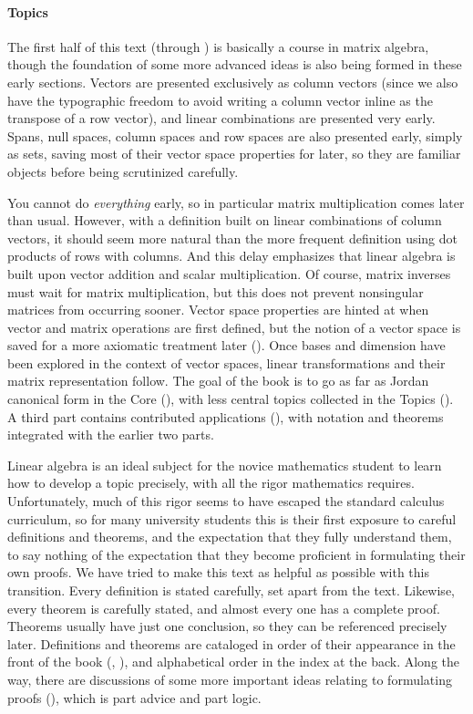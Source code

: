 \paragraph{Topics}
%
The first half of this text (through ) is basically a course in matrix algebra, though the foundation of some more advanced ideas is also being formed in these early sections.  Vectors are presented exclusively as column vectors (since we also have the typographic freedom to avoid writing a column vector inline as the transpose of a row vector), and linear combinations are presented very early.  Spans, null spaces, column spaces and row spaces are also presented early, simply as sets, saving most of their vector space properties for later, so they are familiar objects before being scrutinized carefully.\par
%
You cannot do {\em everything} early, so in particular matrix multiplication comes later than usual.  However, with a definition built on linear combinations of column vectors, it should seem more natural than the more frequent definition using dot products of rows with columns.  And this delay emphasizes that linear algebra is built upon vector addition and scalar multiplication.  Of course, matrix inverses must wait for matrix multiplication, but this does not prevent nonsingular matrices from occurring sooner.  Vector space properties are hinted at when vector and matrix operations are first defined, but the notion of a vector space is saved for a more axiomatic treatment later ().  Once bases and dimension have been explored in the context of vector spaces, linear transformations and their matrix representation follow.  The goal of the book is to go as far as Jordan canonical form in the Core (), with less central topics collected in the Topics ().  A third part contains contributed applications (), with notation and theorems integrated with the earlier two parts.\par
%
Linear algebra is an ideal subject for the novice mathematics student to learn how to develop a topic precisely, with all the rigor mathematics requires.  Unfortunately, much of this rigor seems to have escaped the standard calculus curriculum, so for many university students this is their first exposure to careful definitions and theorems, and the expectation that they fully understand them, to say nothing of the expectation that they become proficient in formulating their own proofs.  We have tried to make this text as helpful as possible with this transition.  Every definition is stated carefully, set apart from the text.  Likewise, every theorem is carefully stated, and almost every one has a complete proof.  Theorems usually have just one conclusion, so they can be referenced precisely later.  Definitions and theorems are cataloged in order of their appearance in the front of the book (, ), and alphabetical order in the index at the back.  Along the way, there are discussions of some more important ideas relating to formulating proofs (), which is part advice and part logic.\par
%
